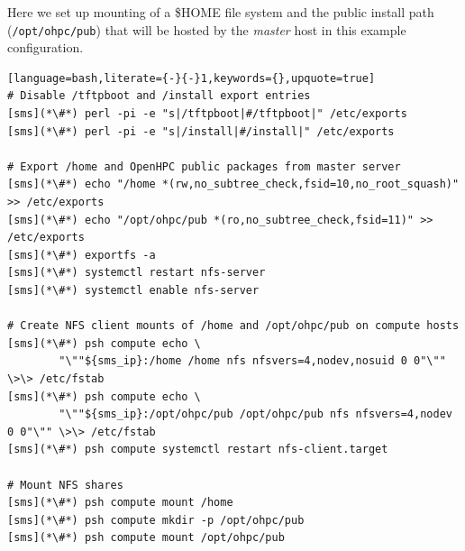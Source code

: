 Here we set up \NFS{}  mounting of a
\$HOME file system and the public \OHPC{} install path (\texttt{/opt/ohpc/pub})
that will be hosted by the {\em master} host in this  example configuration.

\vspace*{0.15cm}
\begin{lstlisting}[language=bash,literate={-}{-}1,keywords={},upquote=true]
# Disable /tftpboot and /install export entries
[sms](*\#*) perl -pi -e "s|/tftpboot|#/tftpboot|" /etc/exports
[sms](*\#*) perl -pi -e "s|/install|#/install|" /etc/exports

# Export /home and OpenHPC public packages from master server
[sms](*\#*) echo "/home *(rw,no_subtree_check,fsid=10,no_root_squash)" >> /etc/exports
[sms](*\#*) echo "/opt/ohpc/pub *(ro,no_subtree_check,fsid=11)" >> /etc/exports
[sms](*\#*) exportfs -a
[sms](*\#*) systemctl restart nfs-server
[sms](*\#*) systemctl enable nfs-server

# Create NFS client mounts of /home and /opt/ohpc/pub on compute hosts
[sms](*\#*) psh compute echo \
        "\""${sms_ip}:/home /home nfs nfsvers=4,nodev,nosuid 0 0"\"" \>\> /etc/fstab
[sms](*\#*) psh compute echo \
        "\""${sms_ip}:/opt/ohpc/pub /opt/ohpc/pub nfs nfsvers=4,nodev 0 0"\"" \>\> /etc/fstab
[sms](*\#*) psh compute systemctl restart nfs-client.target

# Mount NFS shares
[sms](*\#*) psh compute mount /home
[sms](*\#*) psh compute mkdir -p /opt/ohpc/pub
[sms](*\#*) psh compute mount /opt/ohpc/pub

\end{lstlisting}
